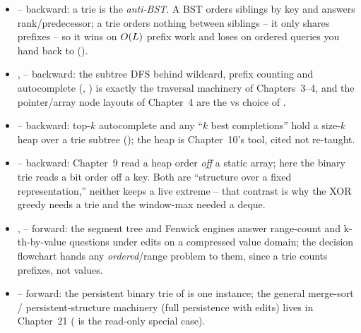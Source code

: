 \begin{itemize}[nosep, leftmargin=1.4em]
  \item {} -- backward: a trie is the \emph{anti-BST}. A BST orders siblings by key and answers
        rank/predecessor; a trie orders nothing between siblings -- it only shares prefixes -- so it wins on
        $O(L)$ prefix work and loses on ordered queries you hand back to  ().
  \item {},  -- backward: the subtree DFS behind wildcard, prefix counting and
        autocomplete (, ) is exactly the traversal machinery of
        Chapters~3--4, and the pointer/array node layouts of Chapter~4 are the  vs 
        choice of .
  \item {} -- backward: top-$k$ autocomplete and any ``$k$ best completions'' hold a size-$k$ heap
        over a trie subtree (); the heap is Chapter~10's tool, cited not re-taught.
  \item {} -- backward: Chapter~9 read a heap order \emph{off} a static array; here the binary trie
        reads a bit order off a key. Both are ``structure over a fixed representation,'' neither keeps a live
        extreme -- that contrast is why the XOR greedy needs a trie and the window-max needed a deque.
  \item {},  -- forward: the segment tree and Fenwick engines answer range-count and
        k-th-by-value questions under edits on a compressed value domain; the decision flowchart hands any
        \emph{ordered}/range problem to them, since a trie counts prefixes, not values.
  \item {} -- forward: the persistent binary trie of  is one instance; the
        general merge-sort / persistent-structure machinery (full persistence with edits) lives in
        Chapter~21 ( is the read-only special case).
\end{itemize}


